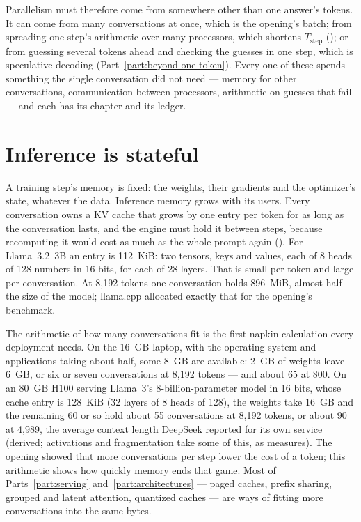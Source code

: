 Parallelism must therefore come from somewhere other than one answer's tokens.
It can come from many conversations at once, which is the opening's batch; from
spreading one step's arithmetic over many processors, which shortens
$T_{\text{step}}$ (); or from guessing several tokens
ahead and checking the guesses in one step, which is speculative decoding
(Part~\ref{part:beyond-one-token}). Every one of these spends something the
single conversation did not need --- memory for other conversations,
communication between processors, arithmetic on guesses that fail --- and
each has its chapter and its ledger.

\section{Inference is stateful}

A training step's memory is fixed: the weights, their gradients and the
optimizer's state, whatever the data. Inference memory grows with its users.
Every conversation owns a KV cache that grows by one entry per token for as
long as the conversation lasts, and the engine must hold it between steps,
because recomputing it would cost as much as the whole prompt again
(). For Llama~3.2~3B an entry is 112~KiB: two tensors, keys and
values, each of 8 heads of 128 numbers in 16 bits, for each of 28 layers. That
is small per token and large per conversation. At 8,192 tokens one
conversation holds 896~MiB, almost half the size of the model; llama.cpp
allocated exactly that for the opening's benchmark.

The arithmetic of how many conversations fit is the first napkin calculation
every deployment needs. On the 16~GB laptop, with the operating system and
applications taking about half, some 8~GB are available: 2~GB of weights leave
6~GB, or six or seven conversations at 8,192 tokens --- and about 65 at 800. On an
80~GB H100 serving Llama~3's 8-billion-parameter model in 16 bits, whose cache
entry is 128~KiB (32 layers of 8 heads of 128), the weights take 16~GB and the
remaining 60 or so hold about 55 conversations at 8,192 tokens, or about 90 at
4,989, the average context length DeepSeek reported for its own service
\cite{deepseek2025inference} (derived; activations and fragmentation take some
of this, as  measures). The opening showed that more
conversations per step lower the cost of a token; this arithmetic shows how
quickly memory ends that game. Most of Parts~\ref{part:serving}
and~\ref{part:architectures} --- paged caches, prefix sharing, grouped and latent
attention, quantized caches --- are ways of fitting more conversations into the
same bytes.

